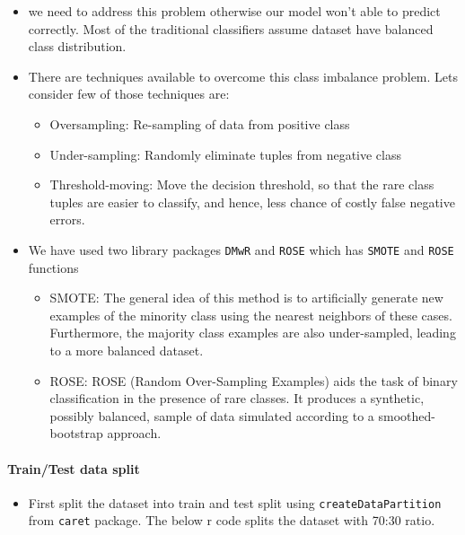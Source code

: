 \documentclass[
]{article}
\providecommand{\tightlist}{%
  \setlength{\itemsep}{0pt}\setlength{\parskip}{0pt}}
\begin{document}
\begin{itemize}
\item
  we need to address this problem otherwise our model won't able to
  predict correctly. Most of the traditional classifiers assume dataset
  have balanced class distribution.
\item
  There are techniques available to overcome this class imbalance
  problem. Lets consider few of those techniques are:

  \begin{itemize}
  \item
    Oversampling: Re-sampling of data from positive class
  \item
    Under-sampling: Randomly eliminate tuples from negative class
  \item
    Threshold-moving: Move the decision threshold, so that the rare
    class tuples are easier to classify, and hence, less chance of
    costly false negative errors.
  \end{itemize}
\item
  We have used two library packages \texttt{DMwR} and \texttt{ROSE}
  which has \texttt{SMOTE} and \texttt{ROSE} functions

  \begin{itemize}
  \item
    SMOTE: The general idea of this method is to artificially generate
    new examples of the minority class using the nearest neighbors of
    these cases. Furthermore, the majority class examples are also
    under-sampled, leading to a more balanced dataset.
  \item
    ROSE: ROSE (Random Over-Sampling Examples) aids the task of binary
    classification in the presence of rare classes. It produces a
    synthetic, possibly balanced, sample of data simulated according to
    a smoothed-bootstrap approach.
  \end{itemize}
\end{itemize}

\hypertarget{traintest-data-split}{%
\paragraph{Train/Test data split}\label{traintest-data-split}}

\begin{itemize}
\tightlist
\item
  First split the dataset into train and test split using
  \texttt{createDataPartition} from \texttt{caret} package. The below r
  code splits the dataset with 70:30 ratio.
\end{itemize}
\end{document}
